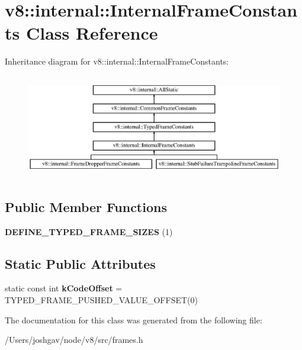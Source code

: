\hypertarget{classv8_1_1internal_1_1_internal_frame_constants}{}\section{v8\+:\+:internal\+:\+:Internal\+Frame\+Constants Class Reference}
\label{classv8_1_1internal_1_1_internal_frame_constants}
Inheritance diagram for v8\+:\+:internal\+:\+:Internal\+Frame\+Constants\+:\begin{figure}[H]
\begin{center}
\leavevmode
\includegraphics[height=4.575163cm]{classv8_1_1internal_1_1_internal_frame_constants}
\end{center}
\end{figure}
\subsection*{Public Member Functions}
\begin{DoxyCompactItemize}
\item 
{\bfseries D\+E\+F\+I\+N\+E\+\_\+\+T\+Y\+P\+E\+D\+\_\+\+F\+R\+A\+M\+E\+\_\+\+S\+I\+Z\+ES} (1)\hypertarget{classv8_1_1internal_1_1_internal_frame_constants_a35411d194bb8236128a8ea7ede090688}{}\label{classv8_1_1internal_1_1_internal_frame_constants_a35411d194bb8236128a8ea7ede090688}

\end{DoxyCompactItemize}
\subsection*{Static Public Attributes}
\begin{DoxyCompactItemize}
\item 
static const int {\bfseries k\+Code\+Offset} = T\+Y\+P\+E\+D\+\_\+\+F\+R\+A\+M\+E\+\_\+\+P\+U\+S\+H\+E\+D\+\_\+\+V\+A\+L\+U\+E\+\_\+\+O\+F\+F\+S\+ET(0)\hypertarget{classv8_1_1internal_1_1_internal_frame_constants_a5a61a5db6e7ee18948b7f5162ad3cf1b}{}\label{classv8_1_1internal_1_1_internal_frame_constants_a5a61a5db6e7ee18948b7f5162ad3cf1b}

\end{DoxyCompactItemize}


The documentation for this class was generated from the following file\+:\begin{DoxyCompactItemize}
\item 
/\+Users/joshgav/node/v8/src/frames.\+h\end{DoxyCompactItemize}
